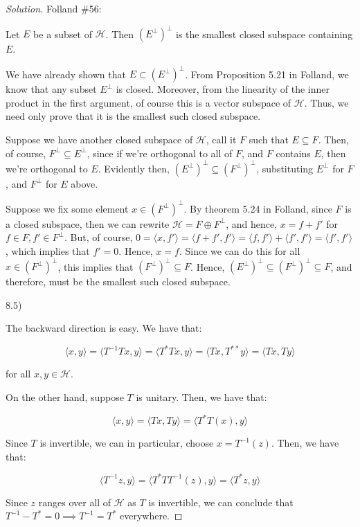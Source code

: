 \documentclass[10pt]{article}
\begin{document}
\begin{proof}[Solution]
Folland \#56:

Let $E$ be a subset of $\mathcal{H}$. Then $(E^\perp)^\perp$ is the smallest closed subspace containing $E$.

We have already shown that $E \subset (E^\perp)^\perp$. From Proposition 5.21 in Folland, we know that any subset $E^\perp$ is closed. Moreover, from the linearity of the inner product in the first argument, of course this is a vector subspace of $\mathcal{H}$. Thus, we need only prove that it is the smallest such closed subspace.

Suppose we have another closed subspace of $\mathcal{H}$, call it $F$ such that $E \subseteq F$. Then, of course, $F^\perp \subseteq E^\perp$, since if we're orthogonal to all of $F$, and $F$ contains $E$, then we're orthogonal to $E$. Evidently then, $(E^\perp)^\perp \subseteq (F^\perp)^\perp$, substituting $E^\perp$ for $F$, and $F^\perp$ for $E$ above.

Suppose we fix some element $x \in (F^\perp)^\perp$. By theorem 5.24 in Folland, since $F$ is a closed subspace, then we can rewrite $\mathcal{H} = F \oplus F^\perp$, and hence, $x = f + f'$ for $f \in F, f' \in F^\perp$. But, of course, $0 = \langle x, f' \rangle = \langle f + f', f' \rangle = \langle f, f' \rangle + \langle f', f' \rangle = \langle f', f' \rangle$, which implies that $f' = 0$. Hence, $x = f$. Since we can do this for all $x \in (F^\perp)^\perp$, this implies that $(F^\perp)^\perp \subseteq F$. Hence, $(E^\perp)^\perp \subseteq (F^\perp)^\perp \subseteq F$, and therefore, must be the smallest such closed subspace. 


8.5)

The backward direction is easy. We have that:

$$ \langle x, y \rangle = \langle T^{-1} T x ,y \rangle = \langle T^* T x , y \rangle = \langle Tx, T^{**} y \rangle = \langle Tx, Ty \rangle$$

for all $x, y \in \mathcal{H}$. 

On the other hand, suppose $T$ is unitary. Then, we have that:

$$ \langle x, y \rangle = \langle Tx, Ty \rangle = \langle T^* T(x), y \rangle$$

Since $T$ is invertible, we can in particular, choose $x =  T^{-1}(z)$. Then, we have that:

$$ \langle T^{-1}z, y \rangle = \langle T^* TT^{-1}(z), y \rangle = \langle T^* z, y \rangle $$

Since $z$ ranges over all of $\mathcal{H}$ as $T$ is invertible, we can conclude that $T^{-1} - T^* = 0 \implies T^{-1} = T^*$ everywhere. 

\end{proof}
\end{document}
